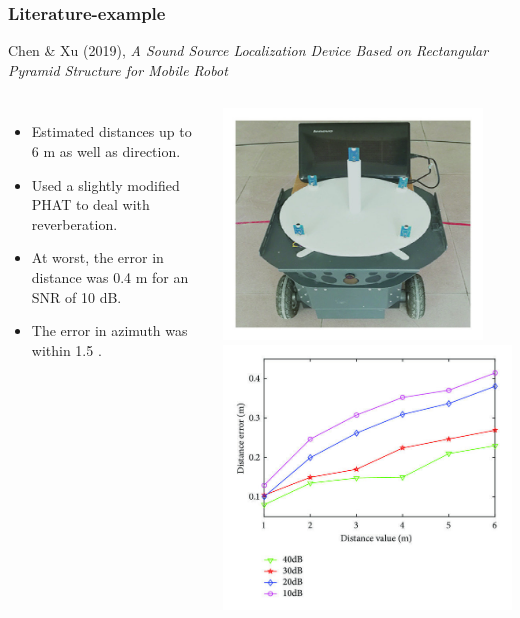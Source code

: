 \documentclass{beamer}
\begin{document}
\begin{frame}
\frametitle{Literature-example}

Chen \& Xu (2019), \textit{A Sound Source Localization Device Based on Rectangular Pyramid Structure for Mobile Robot} \cite{chen_sound_2019}

\begin{columns}

\begin{itemize}
	\item Estimated distances up to 6 \si{m} as well as direction.
	\item Used a slightly modified PHAT to deal with reverberation.
	\item At worst, the error in distance was 0.4 \si{m} for an SNR of 10 \si{dB}.
	\item The error in azimuth was within 1.5 \si{\deg}.
\end{itemize}

\includegraphics[width=0.9\textwidth]{./chen_2019/array.jpg}\\
\includegraphics[width=1.0\textwidth]{./chen_2019/distance_SNR.jpg}
\cite{chen_sound_2019}


\end{columns}
\end{frame}
\end{document}
